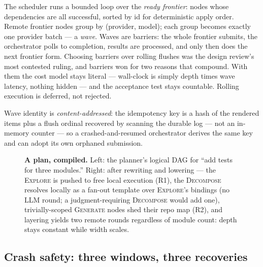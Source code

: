\documentclass[11pt]{article}
\begin{document}
The scheduler runs a bounded loop over the \emph{ready frontier}: nodes whose dependencies are all successful, sorted by id for deterministic apply order. Remote frontier nodes group by (provider, model); each group becomes exactly one provider batch --- a \emph{wave}. Waves are barriers: the whole frontier submits, the orchestrator polls to completion, results are processed, and only then does the next frontier form. Choosing barriers over rolling flushes was the design review's most contested ruling, and barriers won for two reasons that compound. With them the cost model stays literal --- wall-clock is simply depth times wave latency, nothing hidden --- and the acceptance test stays countable. Rolling execution is deferred, not rejected.

Wave identity is \emph{content-addressed}: the idempotency key is a hash of the rendered items plus a flush ordinal recovered by scanning the durable log --- not an in-memory counter --- so a crashed-and-resumed orchestrator derives the same key and can adopt its own orphaned submission.

\begin{figure}[!htbp]
\centering

\caption{\textbf{A plan, compiled.} Left: the planner's logical DAG for ``add tests for three modules.'' Right: after rewriting and lowering --- the \textsc{Explore} is pushed to free local execution (R1), the \textsc{Decompose} resolves locally as a fan-out template over \textsc{Explore}'s bindings (no LLM round; a judgment-requiring \textsc{Decompose} would add one), trivially-scoped \textsc{Generate} nodes shed their repo map (R2), and layering yields two remote rounds regardless of module count: depth stays constant while width scales.}
\label{fig:plan-example}
\end{figure}

\subsection{Crash safety: three windows, three recoveries}
\label{sec:crash}
\end{document}
